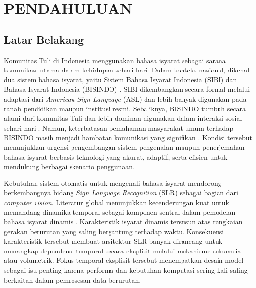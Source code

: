 \newpage
\pagestyle{fancy}
\fancyhf{}
\fancyhead[R]{\thepage}
\chapter{PENDAHULUAN} \label{bab:pendahuluan}

\section{Latar Belakang} \label{sec:latar-belakang}
Komunitas Tuli di Indonesia menggunakan bahasa isyarat sebagai sarana komunikasi utama dalam kehidupan sehari-hari.
Dalam konteks nasional, dikenal dua sistem bahasa isyarat, yaitu Sistem Bahasa Isyarat Indonesia (SIBI) dan Bahasa Isyarat Indonesia (BISINDO) \cite{olivia2022tindakankomunikatif,verushka2024signlanguages}.
SIBI dikembangkan secara formal melalui adaptasi dari \textit{American Sign Language} (ASL) dan lebih banyak digunakan pada ranah pendidikan maupun institusi resmi.
Sebaliknya, BISINDO tumbuh secara alami dari komunitas Tuli dan lebih dominan digunakan dalam interaksi sosial sehari-hari \cite{saraswati2022bisindo}.
Namun, keterbatasan pemahaman masyarakat umum terhadap BISINDO masih menjadi hambatan komunikasi yang signifikan \cite{lavenia2023tuliindonesia,arlinta2020keterbatasan}.
Kondisi tersebut menunjukkan urgensi pengembangan sistem pengenalan maupun penerjemahan bahasa isyarat berbasis teknologi yang akurat, adaptif, serta efisien untuk mendukung berbagai skenario penggunaan.

Kebutuhan sistem otomatis untuk mengenali bahasa isyarat mendorong berkembangnya bidang \textit{Sign Language Recognition} (SLR) sebagai bagian dari \textit{computer vision}.
Literatur global menunjukkan kecenderungan kuat untuk memandang dinamika temporal sebagai komponen sentral dalam pemodelan bahasa isyarat dinamis \cite{rastgoo2021slrdeepsurvey}.
Karakteristik isyarat dinamis tersusun atas rangkaian gerakan berurutan yang saling bergantung terhadap waktu.
Konsekuensi karakteristik tersebut membuat arsitektur SLR banyak dirancang untuk menangkap dependensi temporal secara eksplisit melalui mekanisme sekuensial atau volumetrik.
Fokus temporal eksplisit tersebut menempatkan desain model sebagai isu penting karena performa dan kebutuhan komputasi sering kali saling berkaitan dalam pemrosesan data berurutan.

